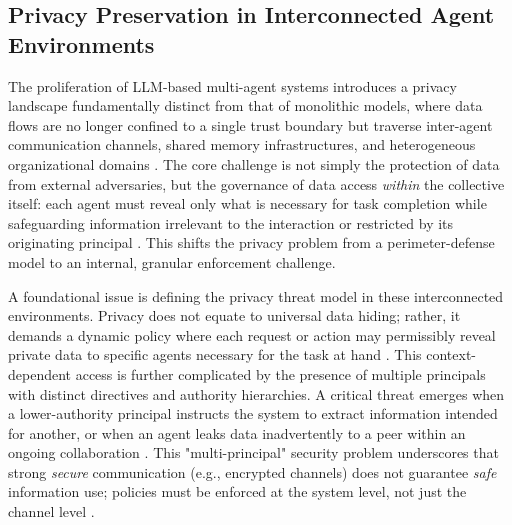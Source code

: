 \documentclass[11pt,a4paper]{article}
\begin{document}
\subsection{Privacy Preservation in Interconnected Agent Environments}


The proliferation of LLM-based multi-agent systems introduces a privacy landscape fundamentally distinct from that of monolithic models, where data flows are no longer confined to a single trust boundary but traverse inter-agent communication channels, shared memory infrastructures, and heterogeneous organizational domains \cite{arxiv:2411.14033v2}. The core challenge is not simply the protection of data from external adversaries, but the governance of data access \emph{within} the collective itself: each agent must reveal only what is necessary for task completion while safeguarding information irrelevant to the interaction or restricted by its originating principal \cite{arxiv:2505.23847v5}. This shifts the privacy problem from a perimeter-defense model to an internal, granular enforcement challenge.

A foundational issue is defining the privacy threat model in these interconnected environments. Privacy does not equate to universal data hiding; rather, it demands a dynamic policy where each request or action may permissibly reveal private data to specific agents necessary for the task at hand \cite{arxiv:2505.18279v1}. This context-dependent access is further complicated by the presence of multiple principals with distinct directives and authority hierarchies. A critical threat emerges when a lower-authority principal instructs the system to extract information intended for another, or when an agent leaks data inadvertently to a peer within an ongoing collaboration \cite{arxiv:2505.23847v5}. This "multi-principal" security problem underscores that strong \emph{secure} communication (e.g., encrypted channels) does not guarantee \emph{safe} information use; policies must be enforced at the system level, not just the channel level \cite{arxiv:2505.18279v1}.
\end{document}
